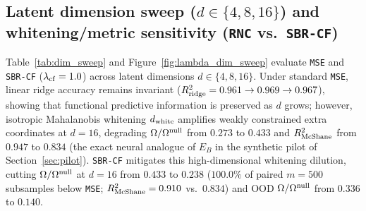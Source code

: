 \documentclass[preprint,11pt,a4paper]{elsarticle}
\begin{document}
\subsection{Latent dimension sweep ($d\in\{4,8,16\}$) and whitening/metric sensitivity (\texttt{RNC} vs.\ \texttt{SBR-CF})}
\label{sec:dim_sweep}
\label{sec:metric_sensitivity}

Table~\ref{tab:dim_sweep} and Figure~\ref{fig:lambda_dim_sweep} evaluate \texttt{MSE} and \texttt{SBR-CF} ($\lambda_{\rm cf}=1.0$) across latent dimensions $d\in\{4,8,16\}$. Under standard \texttt{MSE}, linear ridge accuracy remains invariant ($R^2_{\rm ridge}=0.961\to 0.969\to 0.967$), showing that functional predictive information is preserved as $d$ grows; however, isotropic Mahalanobis whitening $d_{\rm white}$ amplifies weakly constrained extra coordinates at $d=16$, degrading $\Omega/\Omega^{\rm null}$ from $0.273$ to $0.433$ and $R^2_{\rm McShane}$ from $0.947$ to $0.834$ (the exact neural analogue of $E_B$ in the synthetic pilot of Section~\ref{sec:pilot}). \texttt{SBR-CF} mitigates this high-dimensional whitening dilution, cutting $\Omega/\Omega^{\rm null}$ at $d=16$ from $0.433$ to $\mathbf{0.238}$ ($100.0\%$ of paired $m=500$ subsamples below \texttt{MSE}; $R^2_{\rm McShane}=0.910$ vs.\ $0.834$) and OOD $\Omega/\Omega^{\rm null}$ from $0.336$ to $\mathbf{0.140}$.
\end{document}
